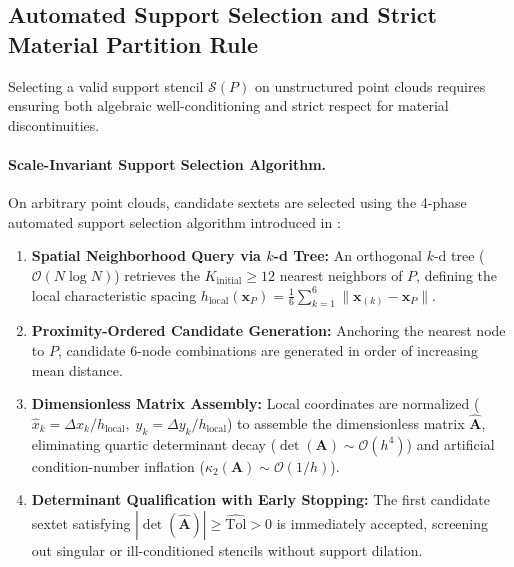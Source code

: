 \documentclass[11pt,a4paper]{article}
\begin{document}
\subsection{Automated Support Selection and Strict Material Partition Rule}
Selecting a valid support stencil $\mathcal{S}(P)$ on unstructured point clouds requires ensuring both algebraic well-conditioning and strict respect for material discontinuities.

\paragraph{Scale-Invariant Support Selection Algorithm.}
On arbitrary point clouds, candidate sextets are selected using the 4-phase automated support selection algorithm introduced in \cite{mesquita_eabe}:
\begin{enumerate}
  \item \textbf{Spatial Neighborhood Query via $k$-d Tree:} An orthogonal $k$-d tree ($\mathcal{O}(N \log N)$) retrieves the $K_{\mathrm{initial}} \ge 12$ nearest neighbors of $P$, defining the local characteristic spacing $h_{\mathrm{local}}(\mathbf{x}_P) = \frac{1}{6}\sum_{k=1}^6 \|\mathbf{x}_{(k)} - \mathbf{x}_P\|$.
  \item \textbf{Proximity-Ordered Candidate Generation:} Anchoring the nearest node to $P$, candidate 6-node combinations are generated in order of increasing mean distance.
  \item \textbf{Dimensionless Matrix Assembly:} Local coordinates are normalized ($\hat{x}_k = \Delta x_k/h_{\mathrm{local}}, \; \hat{y}_k = \Delta y_k/h_{\mathrm{local}}$) to assemble the dimensionless matrix $\widehat{\mathbf{A}}$, eliminating quartic determinant decay ($\det(\mathbf{A}) \sim \mathcal{O}(h^4)$) and artificial condition-number inflation ($\kappa_2(\mathbf{A}) \sim \mathcal{O}(1/h)$).
  \item \textbf{Determinant Qualification with Early Stopping:} The first candidate sextet satisfying $|\det(\widehat{\mathbf{A}})| \ge \widehat{\mathrm{Tol}} > 0$ is immediately accepted, screening out singular or ill-conditioned stencils without support dilation.
\end{enumerate}
\end{document}
